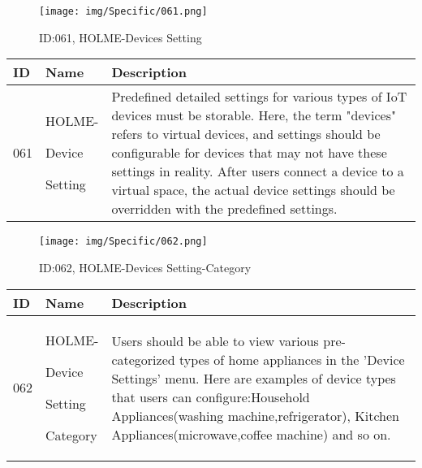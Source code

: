 \documentclass[conference]{IEEEtran}
\begin{document}
\begin{enumerate}
\begin{figure}[h]
\centering
\texttt{[image: img/Specific/061.png]}
\caption{ID:061, HOLME-Devices Setting}
\end{figure}
\begin{table}[h]
\def\arraystretch{1.2} \small
    \begin{tabular}{|p{1cm}|p{1.8cm}|p{5.0cm}|}
        \hline
        ID & Name & Description\\ \hline
         061 \par  & HOLME-\par Device \par Setting  & Predefined detailed settings for various types of IoT devices must be storable. Here, the term "devices" refers to virtual devices, and settings should be configurable for devices that may not have these settings in reality. After users connect a device to a virtual space, the actual device settings should be overridden with the predefined settings.\\ \hline
    \end{tabular}
\end{table}
\clearpage

\begin{figure}[h]
\centering
\texttt{[image: img/Specific/062.png]}
\caption{ID:062, HOLME-Devices Setting-Category}
\end{figure}
\begin{table}[h]
\def\arraystretch{1.2} \small
    \begin{tabular}{|p{1cm}|p{1.8cm}|p{5.0cm}|}
        \hline
        ID & Name & Description\\ \hline
         062 \par  & HOLME-\par Device \par Setting \par Category  & Users should be able to view various pre-categorized types of home appliances in the 'Device Settings' menu. Here are examples of device types that users can configure:Household Appliances(washing machine,refrigerator), Kitchen Appliances(microwave,coffee machine) and so on. \\ \hline
    \end{tabular}
\end{table}


\end{enumerate}
\end{document}

